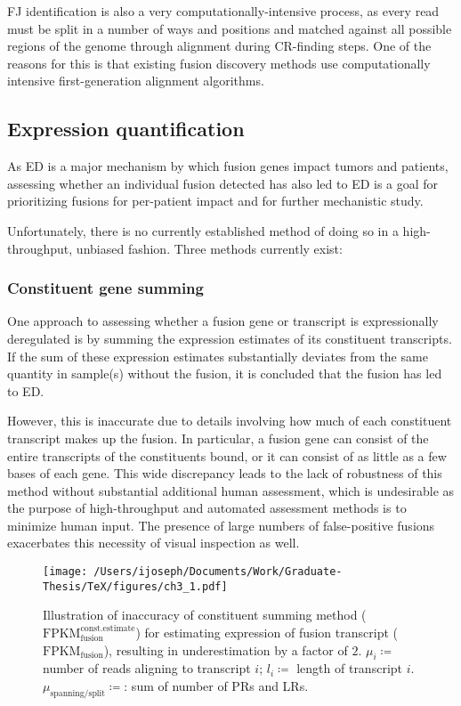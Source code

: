 FJ identification is also a very computationally-intensive process, as every read must be split in a number of ways and positions and matched against all possible regions of the genome through alignment during CR-finding steps. One of the reasons for this is that existing fusion discovery methods use computationally intensive first-generation alignment algorithms. 

\subsection{Expression quantification}

As ED is a major mechanism by which fusion genes impact tumors and patients, assessing whether an individual fusion detected has also led to ED is a goal for prioritizing fusions for per-patient impact and for further mechanistic study.

Unfortunately, there is no currently established method of doing so in a high-throughput, unbiased fashion. Three methods currently exist:

\subsubsection{Constituent gene summing}

One approach to assessing whether a fusion gene or transcript is expressionally deregulated is by summing the expression estimates of its constituent transcripts. If the sum of these expression estimates substantially deviates from the same quantity in sample(s) without the fusion, it is concluded that the fusion has led to ED.

However, this is inaccurate due to details involving how much of each constituent transcript makes up the fusion. In particular, a fusion gene can consist of the entire transcripts of the constituents bound, or it can consist of as little as a few bases of each gene. This wide discrepancy leads to the lack of robustness of this method without substantial additional human assessment, which is undesirable as the purpose of high-throughput and automated assessment methods is to minimize human input. The presence of large numbers of false-positive fusions exacerbates this necessity of visual inspection as well.

\begin{figure}\centering
  \parbox{.9\textwidth}{\centering
\noindent \texttt{[image: /Users/ijoseph/Documents/Work/Graduate-Thesis/TeX/figures/ch3\_1.pdf]}
    \caption{Illustration of inaccuracy of constituent summing method ($\mathrm{FPKM}_{\mathrm{fusion}}^{\mathrm{const.estimate}}$) for estimating expression of fusion transcript ($\mathrm{FPKM}_\mathrm{fusion}$), resulting in underestimation by a factor of $2$. $\mu_i \coloneqq$ number of reads aligning to transcript $i$; $l_i \coloneqq$ length of transcript $i$. $\mu_{\text{spanning/split}} \coloneqq$: sum of number of PRs and LRs.}}
\end{figure}

